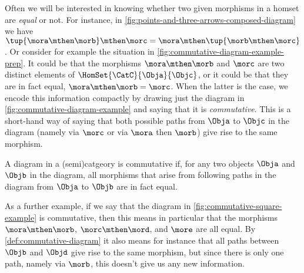 Often we will be interested in knowing whether two given morphisms in a homset are \emph{equal} or not. For instance, in \cref{fig:points-and-three-arrows-composed-diagram} we have $\tup{\mora \mthen \morb} \mthen \morc = \mora \mthen \tup{\morb \mthen \morc}$. Or consider for example the situation in \cref{fig:commutative-diagram-example-prep}. It could be that the morphisms $\mora \mthen \morb$ and $\morc$ are two distinct elements of $\HomSet{\CatC}{\Obja}{\Objc}$, or it could be that they are in fact equal,  $\mora \mthen \morb = \morc$. When the latter is the case, we encode this information compactly by drawing just the diagram in \cref{fig:commutative-diagram-example} and saying that it is \emph{commutative}. This is a short-hand way of saying that both possible paths from $\Obja$ to $\Objc$ in the diagram (namely via $\morc$ or via $\mora$ then $\morb$) give rise to the same morphism. 

\begin{marginfigure}
    \centering
    \caption{}
    \label{fig:commutative-diagram-example-prep}
\end{marginfigure}

\begin{marginfigure}
    \centering
    \caption{}
    \label{fig:commutative-diagram-example}
\end{marginfigure}

\begin{marginfigure}
    \centering
    \caption{}
    \label{fig:commutative-square-example}
\end{marginfigure}


\begin{definition}\label{def:commutative-diagram}
A diagram in a (semi)catgeory is commutative if, for any two objects $\Obja$ and $\Objb$ in the diagram, all morphisms that arise from following paths in the diagram from $\Obja$ to $\Objb$ are in fact equal. 
\end{definition}

As a further example, if we say that the diagram in \cref{fig:commutative-square-example} is commutative, then this means in particular that the morphisms $\mora \mthen \morb$, $\morc \mthen \mord$, and $\more$ are all equal. By \cref{def:commutative-diagram} it also means for instance that all paths between $\Objb$ and $\Objd$ give rise to the same morphism, but since there is only one path, namely via $\morb$, this doesn't give us any new information.

